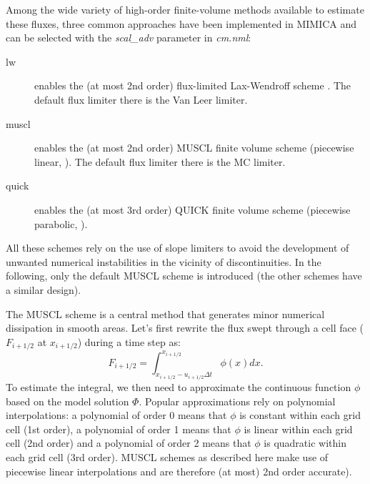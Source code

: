 \documentclass[12pt,A4,french]{article}
\begin{document}
\begin{description}
Among the wide variety of high-order finite-volume methods available to estimate these fluxes, three common approaches have been implemented in MIMICA and can be selected with the {\it scal\_adv} parameter in {\it cm.nml}:
\begin{description}
\item[lw] enables the (at most 2nd order) flux-limited Lax-Wendroff scheme \cite{Dur2010}. The default flux limiter there is the Van Leer limiter. 
\item[muscl] enables the (at most 2nd order) MUSCL finite volume scheme (piecewise linear, \cite{VL1979}). The default flux limiter there is the MC limiter. 
\item[quick] enables the (at most 3rd order) QUICK finite volume scheme (piecewise parabolic, \cite{Leo1991}).
\end{description}
All these schemes rely on the use of slope limiters to avoid the development of unwanted numerical instabilities in the vicinity of discontinuities. In the following, only the default MUSCL scheme is introduced (the other schemes have a similar design).

The MUSCL scheme \cite{VL1979} is a central method that generates minor numerical dissipation in smooth areas. Let's first rewrite the flux swept through a cell face ($F_{i+1/2}$ at $x_{i+1/2}$) during a time step as:
\begin{equation}
F_{i+1/2} = \int^{x_{i+1/2}}_{x_{i+1/2}-u_{i+1/2}\Delta t} \phi \left(x\right) dx.
\label{integral}
\end{equation}
To estimate the integral, we then need to approximate the continuous function $\phi$ based on the model solution $\Phi$. Popular approximations rely on polynomial interpolations: a polynomial of order 0 means that $\phi$ is constant within each grid cell (1st order), a polynomial of order 1 means that $\phi$ is linear within each grid cell (2nd order) and a polynomial of order 2 means that $\phi$ is quadratic within each grid cell (3rd order). MUSCL schemes as described here make use of piecewise linear interpolations and are therefore (at most) 2nd order accurate).


\end{description}
\end{document}
